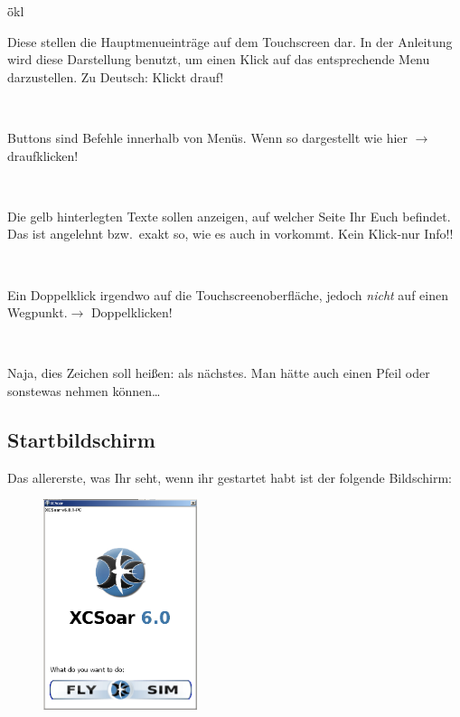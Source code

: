 \begin{tabbing}
\quad\=ökl\hfill \kill
{} \> \parbox[c]{11,4cm}{Diese stellen die Hauptmenueinträge auf dem Touchscreen dar. In der Anleitung wird diese Darstellung benutzt, um einen Klick auf das
entsprechende Menu darzustellen. Zu Deutsch: Klickt drauf!}\\[1.2em]
           \>\parbox[c]{11,4cm}{Buttons sind Befehle innerhalb von Menüs.
Wenn so dargestellt wie  hier $\rightarrow$ draufklicken!}\\[1.2em]
  \>\parbox[c]{11,4cm}{Die gelb hinterlegten Texte sollen anzeigen, auf welcher Seite  Ihr Euch befindet. Das ist angelehnt bzw.\ exakt so, wie es auch in  \xc vorkommt. Kein Klick-nur Info!!}\\[1.2em]
\dklick                           \>\parbox[c]{11,4cm}{Ein Doppelklick irgendwo auf die Touchscreenoberfläche, jedoch \textsl{nicht} auf einen Wegpunkt.$\rightarrow$ Doppelklicken!}\\[1.2em]
\qquad\qquad \blink      \>\parbox[c]{11,4cm}{Naja, dies Zeichen soll heißen: als nächstes. Man hätte auch einen Pfeil oder sonstewas nehmen können\dots}
\end{tabbing}
\subsection{Startbildschirm}
Das allererste, was Ihr seht, wenn ihr \xc gestartet habt ist der folgende Bildschirm:

\begin{figure}
\includegraphics[width=4.5cm]{Bilder/ultrafirst.png}
\end{figure}

